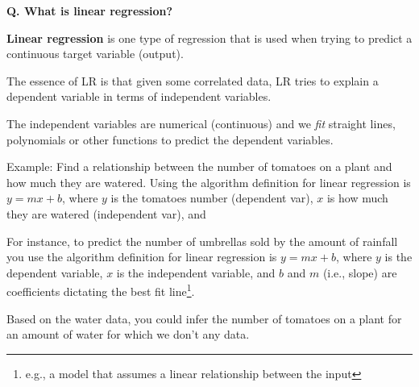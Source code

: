 \begin{frame}[fragile]{\textbf{Q. What is linear regression?}}
  \begin{wideitemize}
  \item \textbf{Linear regression} is one type of regression that is used when
  trying to predict a continuous target variable (output).\medskip
  \begin{wideitemize}
    \item The essence of LR is that given some correlated data, LR tries to
      explain a dependent variable in terms of independent variables.
    \item The independent variables are numerical (continuous) and we \textit{fit} straight
      lines, polynomials or other functions to predict the dependent variables.
  \end{wideitemize}
  \item Example: Find a relationship between the number of tomatoes on a plant
    and how much they are watered. Using the algorithm definition for linear
    regression is $y = mx + b$, where $y$ is the tomatoes number (dependent
    var), $x$ is how much they are watered (independent var), and 
  \item For instance, to predict the number of umbrellas sold by the amount of
  rainfall you use the algorithm definition for linear regression is $y = mx + b$,
  where $y$ is the dependent variable, $x$ is the independent variable, and $b$
  and $m$ (i.e., slope) are coefficients dictating the best fit line\footnote{e.g., a
  model that assumes a linear relationship between the input}.\medskip
  \begin{wideitemize}
    \item Based on the water data, you could infer the number of tomatoes on a
      plant for an amount of water for which we don't any data.
  \end{wideitemize}
  \end{wideitemize}
\end{frame}

